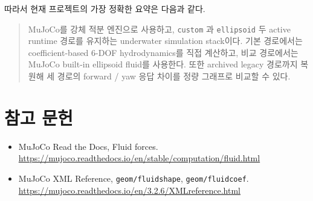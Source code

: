 \documentclass[11pt,a4paper]{article}
\newcommand{\code}[1]{\nolinkurl{#1}}
\begin{document}
따라서 현재 프로젝트의 가장 정확한 요약은 다음과 같다.

\begin{quote}
MuJoCo를 강체 적분 엔진으로 사용하고, \code{custom} 과 \code{ellipsoid} 두 active runtime 경로를 유지하는 underwater simulation stack이다. 기본 경로에서는 coefficient-based 6-DOF hydrodynamics를 직접 계산하고, 비교 경로에서는 MuJoCo built-in ellipsoid fluid를 사용한다. 또한 archived legacy 경로까지 복원해 세 경로의 forward / yaw 응답 차이를 정량 그래프로 비교할 수 있다.
\end{quote}

\section*{참고 문헌}

\begin{itemize}[leftmargin=2em]
  \item MuJoCo Read the Docs, Fluid forces.\\
  \url{https://mujoco.readthedocs.io/en/stable/computation/fluid.html}
  \item MuJoCo XML Reference, \texttt{geom/fluidshape}, \texttt{geom/fluidcoef}.\\
  \url{https://mujoco.readthedocs.io/en/3.2.6/XMLreference.html}
\end{itemize}
\end{document}
